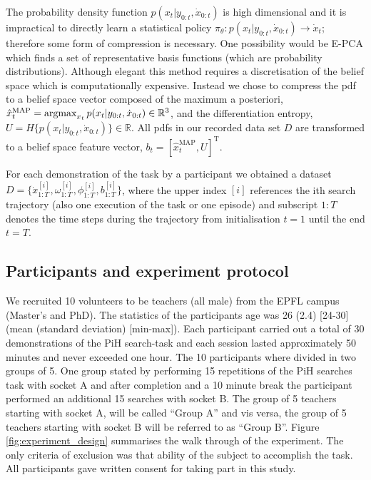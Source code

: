 The probability density function $p(x_t|y_{0:t},\dot{x}_{0:t})$ is high dimensional and it is 
impractical to directly learn a statistical policy $\pi_{\theta} : p(x_t|y_{0:t},\dot{x}_{0:t}) \rightarrow \dot{x}_t$; 
therefore some form of compression is necessary. One possibility would be E-PCA \cite{E-PCA} which finds a set of 
representative basis functions (which are probability distributions). Although elegant this method 
requires a discretisation of the belief space which is computationally expensive. Instead we chose to 
compress the pdf to a belief space vector composed of the maximum a posteriori, $\hat{x}^{\mathrm{MAP}}_t = \argmax_{x_t} p(x_t|y_{0:t},\dot{x}_{0:t}) \in \mathbb{R}^3$, and the differentiation entropy, 
$U = H\{p(x_t|y_{0:t},\dot{x}_{0:t})\} \in \mathbb{R}$. All pdfs in our recorded data set $D$ are transformed to 
a belief space feature vector, $b_t = [\hat{x}^{\mathrm{MAP}}_t,U]^{\mathrm{T}}$. 

For each demonstration of the task by a participant we obtained a dataset $D=\{\dot{x}^{[i]}_{1:T},\omega^{[i]}_{1:T},\phi^{[i]}_{1:T},b^{[i]}_{1:T}\}$, 
where the upper index $[i]$ references the ith search trajectory (also one execution of the task or one episode) and 
subscript $1:T$ denotes the time steps during the trajectory from initialisation $t=1$ until the end $t=T$. 

\subsection{Participants and experiment protocol}

We recruited 10 volunteers to be teachers (all male) from the EPFL campus (Master's and PhD). The statistics of the 
participants age was 26 (2.4) [24-30] (mean (standard deviation) [min-max]). Each participant carried out a total 
of 30 demonstrations of the PiH search-task and each session lasted approximately 50 minutes and never exceeded one hour. 
The 10 participants where divided in two groups of 5. One group stated by performing 15 repetitions of the PiH searches task with socket A
and after completion and a 10 minute break the participant performed an additional 15 searches with socket B.
The group of 5 teachers starting with socket A, will be called ``Group A'' and vis versa, the group of 5 teachers starting with socket B will 
be referred to as ``Group B''. Figure \ref{fig:experiment_design} summarises the walk through of the experiment.
The only criteria of exclusion was that ability of the subject to accomplish the task. All participants gave written consent 
for taking part in this study.

